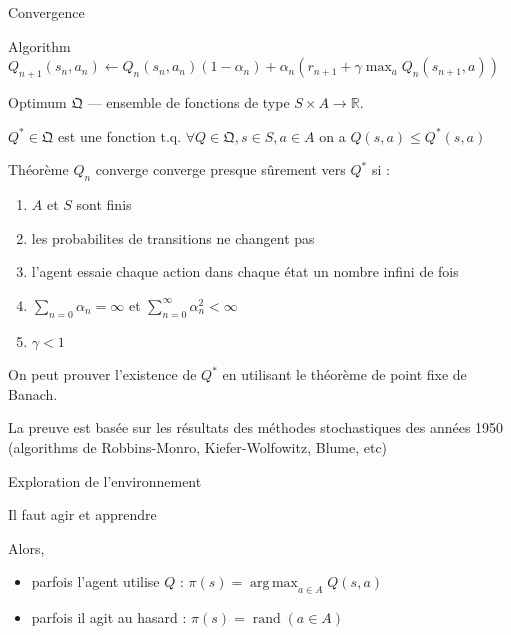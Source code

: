 \documentclass{beamer}
\newcommand{\R}{\mathbb{R}}
\DeclareMathOperator*{\argmax}{arg\,max}
\DeclareMathOperator*{\rand}{rand}
\begin{document}
\begin{frame}[t]{Convergence}

  {
    \scriptsize
    \begin{block}{Algorithm}
      $ Q_{n+1}(s_n,a_n) \leftarrow Q_n(s_n,a_n) (1 - \alpha_n) +
        \alpha_n \left( r_{n+1} + \gamma \max_a Q_n(s_{n+1},a)     \right)$
    \end{block}
  }
  
  \begin{block}{Optimum}
    $\mathfrak{Q}$ --- ensemble de fonctions de type $S \times A \to \R$.

    $Q^* \in \mathfrak{Q}$ est une fonction t.q. $\forall Q \in
    \mathfrak{Q}, s \in S, a \in A$ on a $Q(s,a) \le Q^* (s,a)$
  \end{block}
  
  
  \begin{block}{Théorème}
      $Q_n$ converge converge presque sûrement vers $Q^*$ si :
      \begin{enumerate}
      \item $A$ et $S$ sont finis
      \item les probabilites de transitions ne changent pas
    \item l'agent essaie chaque action dans chaque état un nombre infini de fois
    \item $\sum_{n=0} \alpha_n = \infty$ et $\sum_{n=0}^\infty \alpha_n^2 < \infty$
    \item $\gamma < 1$
    \end{enumerate}
  \end{block}

\end{frame}

\begin{frame}

  On peut prouver l'existence de $Q^*$ en utilisant le théorème de point fixe de Banach.

  \vspace{1em}

  La preuve est basée sur les résultats des méthodes stochastiques des
  années 1950 (algorithms de Robbins-Monro, Kiefer-Wolfowitz, Blume, etc)

\end{frame}

\begin{frame}{Exploration de l'environnement}
  
  \centering

  Il faut agir et apprendre

  \begin{block}{Alors,}
    \begin{itemize}
    \item parfois l'agent utilise $Q$ : $\pi (s) = \argmax_{a \in A} Q(s, a)$
    \item parfois il agit au hasard : $\pi (s) = \rand (a \in A) $
    \end{itemize}
  \end{block}


\end{frame}
\end{document}
